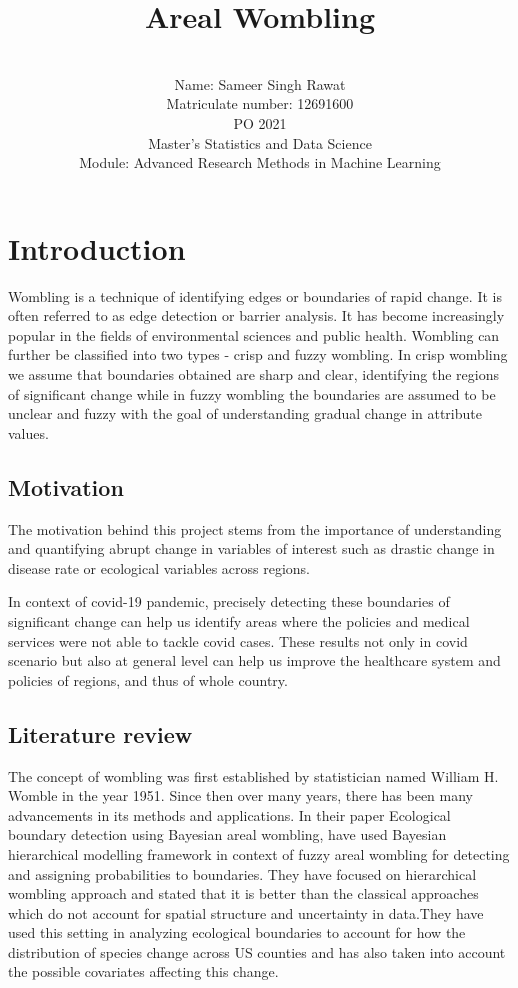 \documentclass[enabledeprecatedfontcommands,parskip=half,twoside=semi,BCOR=0mm]{scrreprt}
\title{Areal Wombling}
\author{\\
Name: Sameer Singh Rawat\\
Matriculate number: 12691600\\
PO 2021\\
Master's Statistics and Data Science\\
Module: Advanced Research Methods in Machine Learning}
\date{}
\numberwithin{equation}{chapter}
\theoremstyle{definition}
\theoremstyle{remark}
\begin{document}

	
    \maketitle
    
    \tableofcontents
	\newpage
    
    \chapter{Introduction}
    Wombling is a technique of identifying edges or boundaries of rapid change. It is often referred to as edge detection or barrier analysis. It has become increasingly popular in the fields of environmental sciences and public health. Wombling can further be classified into two types - crisp and fuzzy wombling. In crisp wombling we assume that boundaries obtained are sharp and clear, identifying the regions of significant change while in fuzzy wombling the boundaries are assumed to be unclear and fuzzy with the goal of understanding gradual change in attribute values.
    
    \section{Motivation}
    The motivation behind this project stems from the importance of understanding and quantifying abrupt change in variables of interest such as drastic change in disease rate or ecological variables across regions.
    
    In context of covid-19 pandemic, precisely detecting these boundaries of significant change can help us identify areas where the policies and medical services were not able to tackle covid cases. These results not only in covid scenario but also at general level can help us improve the healthcare system and policies of regions, and thus of whole country.  
    
    \section{Literature review}
    The concept of wombling was first established by statistician named William H. Womble in the year 1951. Since then over many years, there has been many advancements in its methods and applications. In their paper Ecological boundary detection using Bayesian areal wombling, \cite{Fitzpatrick.2010} have used Bayesian hierarchical modelling framework in context of fuzzy areal wombling for detecting and assigning probabilities to boundaries. They have focused on hierarchical wombling approach and stated that it is better than the classical approaches which do not account for spatial structure and uncertainty in data.They have used this setting in analyzing ecological boundaries to account for how the distribution of species change across US counties and has also taken into account the possible covariates affecting this change.
\end{document}
